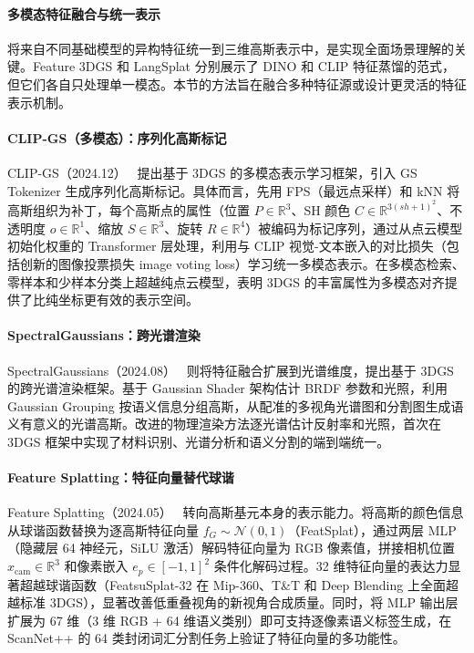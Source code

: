\paragraph{多模态特征融合与统一表示}

将来自不同基础模型的异构特征统一到三维高斯表示中，是实现全面场景理解的关键。Feature 3DGS 和 LangSplat 分别展示了 DINO 和 CLIP 特征蒸馏的范式，但它们各自只处理单一模态。本节的方法旨在融合多种特征源或设计更灵活的特征表示机制。

\paragraph{CLIP-GS（多模态）：序列化高斯标记} CLIP-GS（2024.12）~\cite{2412_19142} 提出基于 3DGS 的多模态表示学习框架，引入 GS Tokenizer 生成序列化高斯标记。具体而言，先用 FPS（最远点采样）和 kNN 将高斯组织为补丁，每个高斯点的属性（位置 $P \in \mathbb{R}^3$、SH 颜色 $C \in \mathbb{R}^{3(sh+1)^2}$、不透明度 $o \in \mathbb{R}^1$、缩放 $S \in \mathbb{R}^3$、旋转 $R \in \mathbb{R}^4$）被编码为标记序列，通过从点云模型初始化权重的 Transformer 层处理，利用与 CLIP 视觉-文本嵌入的对比损失（包括创新的图像投票损失 image voting loss）学习统一多模态表示。在多模态检索、零样本和少样本分类上超越纯点云模型，表明 3DGS 的丰富属性为多模态对齐提供了比纯坐标更有效的表示空间。

\paragraph{SpectralGaussians：跨光谱渲染} SpectralGaussians（2024.08）~\cite{2408_06975} 则将特征融合扩展到光谱维度，提出基于 3DGS 的跨光谱渲染框架。基于 Gaussian Shader 架构估计 BRDF 参数和光照，利用 Gaussian Grouping 按语义信息分组高斯，从配准的多视角光谱图和分割图生成语义有意义的光谱高斯。改进的物理渲染方法逐光谱估计反射率和光照，首次在 3DGS 框架中实现了材料识别、光谱分析和语义分割的端到端统一。

\paragraph{Feature Splatting：特征向量替代球谐} Feature Splatting（2024.05）~\cite{2405_15518} 转向高斯基元本身的表示能力。将高斯的颜色信息从球谐函数替换为逐高斯特征向量 $f_G \sim \mathcal{N}(0, 1)$（FeatSplat），通过两层 MLP（隐藏层 64 神经元，SiLU 激活）解码特征向量为 RGB 像素值，拼接相机位置 $x_{\text{cam}} \in \mathbb{R}^3$ 和像素嵌入 $e_p \in [-1,1]^2$ 条件化解码过程。32 维特征向量的表达力显著超越球谐函数（FeatsuSplat-32 在 Mip-360、T\&T 和 Deep Blending 上全面超越标准 3DGS），显著改善低重叠视角的新视角合成质量。同时，将 MLP 输出层扩展为 67 维（3 维 RGB + 64 维语义类别）即可支持逐像素语义标签生成，在 ScanNet++ 的 64 类封闭词汇分割任务上验证了特征向量的多功能性。

